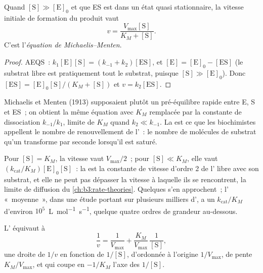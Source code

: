 \begin{theorem}\label{thm:b3:complex-kinetics:michaelis-menten}
Quand $[\mathrm S] \gg [\mathrm E]_0$ et que ES est dans un état quasi
stationnaire, la vitesse initiale de formation du produit vaut
\[
  v = \frac{V_{\max}[\mathrm S]}{K_M + [\mathrm S]} .
\]
C'est l'\emph{équation de Michaelis--Menten}.
\end{theorem}

\begin{proof}
AEQS~: $k_1[\mathrm E][\mathrm S] = (k_{-1} + k_2)[\mathrm{ES}]$, et $[\mathrm E] = [\mathrm E]_0 - [\mathrm{ES}]$ (le
substrat libre est pratiquement tout le substrat, puisque $[\mathrm S] \gg [\mathrm E]_0$). Donc $[\mathrm{ES}]
= [\mathrm E]_0[\mathrm S]/(K_M + [\mathrm S])$ et $v = k_2[\mathrm{ES}]$.
\end{proof}

\begin{remark}
Michaelis et Menten (1913) supposaient plutôt un pré-équilibre rapide
entre E, S et ES~; on obtient la même équation avec $K_M$ remplacée par
la constante de dissociation
$k_{-1}/k_1$, limite de $K_M$ quand $k_2 \ll k_{-1}$. La  est ce que les biochimistes appellent le nombre de
renouvellement de l'~: le nombre de molécules de substrat qu'un
 transforme par seconde lorsqu'il est saturé.
\end{remark}

Pour $[\mathrm S] = K_M$, la vitesse vaut $V_{\max}/2$~; pour $[\mathrm S] \ll K_M$, elle vaut $(k_{\mathrm{cat}}/K_M)[\mathrm E]_0[\mathrm S]$~: la
 est la constante de vitesse d'ordre 2 de
l' libre avec son substrat, et elle ne peut pas dépasser la vitesse
à laquelle ils se rencontrent, la limite de diffusion du
\cref{ch:b3:rate-theories}. Quelques  s'en approchent~;
l' «~moyenne~», dans une étude portant sur plusieurs milliers
d', a un $k_{\mathrm{cat}}/K_M$ d'environ
$10^5$~\unit{L.mol^{-1}.s^{-1}}, quelque quatre ordres de grandeur
au-dessous.

\begin{proposition}\label{prop:b3:complex-kinetics:lineweaver}
L' équivaut à
\[
  \frac1v = \frac{1}{V_{\max}} + \frac{K_M}{V_{\max}}\,\frac{1}{[\mathrm S]},
\]
une droite de $1/v$ en fonction de $1/[\mathrm S]$, d'ordonnée à
l'origine $1/V_{\max}$, de pente $K_M/V_{\max}$, et qui coupe en
$-1/K_M$ l'axe des $1/[\mathrm S]$.
\end{proposition}

